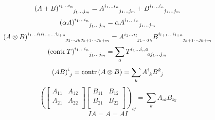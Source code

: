 \documentclass[stu, babel, american, biblatex, a4paper, leqno, draftall]{apa7}
\begin{document}
\begin{equation}\label{Tensor:Sum}
    \tensor{\left(A+B\right)}{
        ^{i_1}^{\dots}^{i_n}
            _{j_1}_{\dots}_{j_m}
    }
    =
    \tensor{A}{
        ^{i_1}^{\dots}^{i_n}
            _{j_1}_{\dots}_{j_m}
    }
    +
    \tensor{B}{
        ^{i_1}^{\dots}^{i_n}
            _{j_1}_{\dots}_{j_m}
    }
\end{equation}
\begin{equation}\label{Tensor:Product:Scalar}
    \tensor{\left(\alpha A\right)}{
        ^{i_1}^{\dots}^{i_n}
            _{j_1}_{\dots}_{j_m}
    }
    =
    \alpha
    \tensor{A}{
        ^{i_1}^{\dots}^{i_n}
            _{j_1}_{\dots}_{j_m}
    }
\end{equation}
\begin{equation}\label{Tensor:Product:Tensor}
    \tensor{\left(A\otimes B\right)}{
        ^{i_1}^{\dots}^{i_l}^{i_{l+1}}^{\dots}^{i_{l+n}}
            _{j_1}_{\dots}_{j_k}_{j_{k+1}}_{\dots}_{j_{k+m}}
    }
    =
    \tensor{A}{
        ^{i_1}^{\dots}^{i_l}
            _{j_1}_{\dots}_{j_k}
    }
    \tensor{B}{
        ^{i_{l+1}}^{\dots}^{i_{l+n}}
            _{j_{k+1}}_{\dots}_{j_{k+m}}
    }
\end{equation}
\begin{equation}\label{Tensor:Contraction}
    \tensor{\left(\contr{\tensor{T}{}}\right)}{
        ^{i_1}^{\dots}^{i_n}
            _{j_1}_{\dots}_{j_m}
    }
    =
    \sum_a{\tensor{T}{
    ^{i_1}^{\dots}^{i_n}^a
    _a_{j_1}_{\dots}_{j_m}
    }}
\end{equation}
\begin{equation}\label{Matrix:Product}
    \tensor{\left(AB\right)}{^i_j}
    =\contr{\left(A\otimes B\right)}
    =\sum_k\tensor{A}{^i_k}\tensor{B}{^k_j}
\end{equation}
\begin{equation}\label{Matrix:Product:Block}
    \left(\begin{bmatrix}
        A_{11} & A_{12} \\
        A_{21} & A_{22} \\
    \end{bmatrix}
    \begin{bmatrix}
        B_{11} & B_{12} \\
        B_{21} & B_{22} \\
    \end{bmatrix}\right)_{ij}
    =
    \sum_k A_{ik} B_{kj}
\end{equation}
\begin{equation}\label{Matrix:Identity}
    IA = A = AI
\end{equation}
\end{document}
